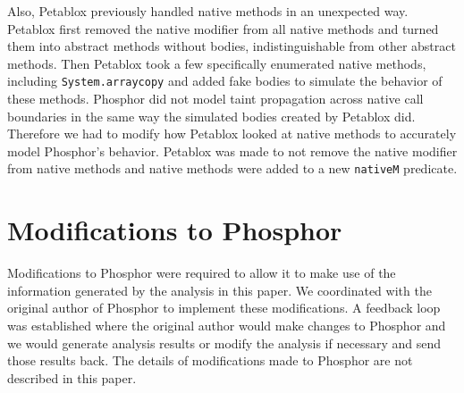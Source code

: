 Also, Petablox previously handled native methods in an unexpected
way. Petablox first removed the native modifier from all native
methods and turned them into abstract methods without bodies,
indistinguishable from other abstract methods. Then Petablox took a
few specifically enumerated native methods, including
\texttt{System.arraycopy} and added fake bodies to simulate the
behavior of these methods. Phosphor did not model taint propagation
across native call boundaries in the same way the simulated bodies
created by Petablox did. Therefore we had to modify how Petablox
looked at native methods to accurately model Phosphor's
behavior. Petablox was made to not remove the native modifier from
native methods and native methods were added to a new \texttt{nativeM}
predicate.
\section{Modifications to Phosphor}
Modifications to Phosphor were required to allow it to make use of the
information generated by the analysis in this paper. We coordinated
with the original author of Phosphor to implement these
modifications. A feedback loop was established where the original
author would make changes to Phosphor and we would generate analysis
results or modify the analysis if necessary and send those results
back. The details of modifications made to Phosphor are not described
in this paper.
